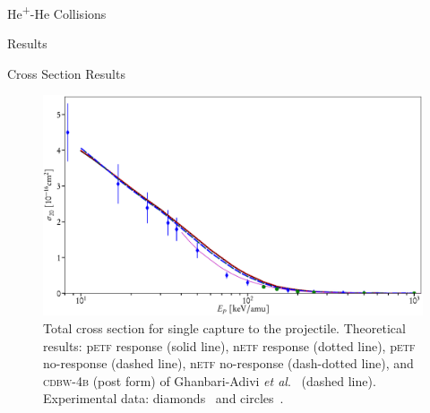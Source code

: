 \documentclass[letterpaper, 11 pt]{report}
\begin{document}
\begin{chapter}{\texorpdfstring{He\textsuperscript{+}}{He+}-He Collisions \label{chap:hephe}}
\begin{section}{Results \label{sec:hephe-disc}}
\begin{subsection}{Cross Section Results \label{sec:hephe-res}}
         \begin{figure}[t]
            \centering
            \includegraphics[width = \linewidth]{./images/hephe-cross/HepHe-120.eps}
            \caption[Total cross section for single capture to the projectile He\textsuperscript{+}-He
                     collisions.]
                    {Total cross section for single capture to the projectile.
                     Theoretical results: p\textsc{etf} response (solid line), n\textsc{etf} response
                                          (dotted line), p\textsc{etf} no-response (dashed line),
                                          n\textsc{etf} no-response (dash-dotted line), and
                                          \textsc{cdbw-4b} (post form) of Ghanbari-Adivi
                                          \textit{et al}.~\cite{GAG15} (dashed line).
                     Experimental data: diamonds~\cite{Dub-89} and circles~\cite{FTFHLP-95}.
                     \label{fig:cs120}}
         \end{figure}


\end{subsection}
\end{section}
\end{chapter}
\end{document}
